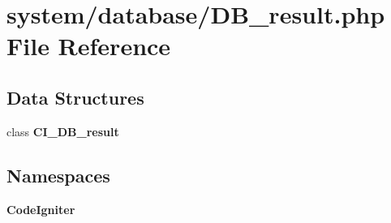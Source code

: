 \section{system/database/\-D\-B\-\_\-result.php File Reference}
\label{_d_b__result_8php}
\subsection*{Data Structures}
\begin{DoxyCompactItemize}
\item 
class {\bf C\-I\-\_\-\-D\-B\-\_\-result}
\end{DoxyCompactItemize}
\subsection*{Namespaces}
\begin{DoxyCompactItemize}
\item 
{\bf Code\-Igniter}
\end{DoxyCompactItemize}
